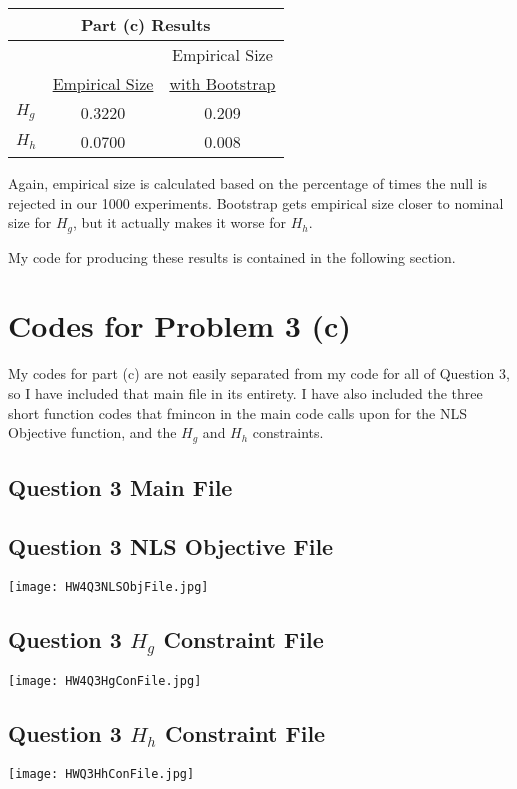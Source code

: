 \documentclass[11pt]{article}
\theoremstyle{definition}
\begin{document}
\begin{center}
\begin{tabular}{l c c}
\hline\hline
\multicolumn{3}{c}{\textbf{Part (c) Results}} \\
\hline\hline 
 & & Empirical Size \\
 & \underline{Empirical Size} & \underline{with Bootstrap} \\
$H_{g}$ & 0.3220 & 0.209 \\
$H_{h}$ & 0.0700 & 0.008 \\
\hline\hline
\end{tabular} 
\end{center} 
\noindent
Again, empirical size is calculated based on the percentage of times the null is rejected in our 1000 experiments.  Bootstrap gets empirical size closer to nominal size for $H_{g}$, but it actually makes it worse for $H_{h}$.  

My code for producing these results is contained in the following section.

\section{Codes for Problem 3 (c)} 
My codes for part (c) are not easily separated from my code for all of Question 3, so I have included that main file in its entirety.  I have also included the three short function codes that fmincon in the main code calls upon for the NLS Objective function, and the $H_{g}$ and $H_{h}$ constraints.

\subsection{Question 3 Main File}

\begin{center}

\end{center}

\subsection{Question 3 NLS Objective File}

\begin{center}
\texttt{[image: HW4Q3NLSObjFile.jpg]}
\end{center}

\subsection{Question 3 $H_{g}$ Constraint File}

\begin{center}
\texttt{[image: HW4Q3HgConFile.jpg]}
\end{center}

\newpage
\subsection{Question 3 $H_{h}$ Constraint File}

\begin{center}
\texttt{[image: HWQ3HhConFile.jpg]}
\end{center}
\end{document}
